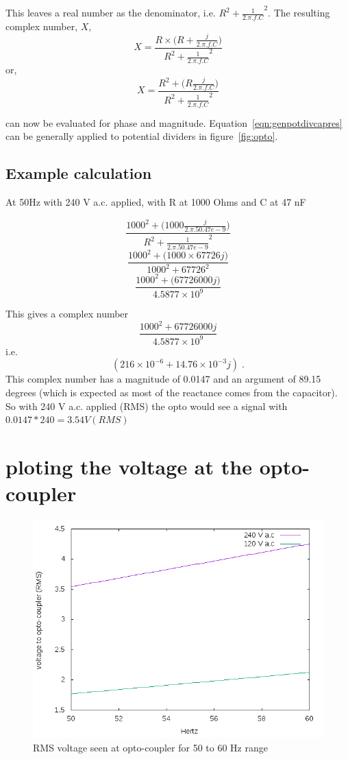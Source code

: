 \documentclass[a4paper,10pt]{article}
\begin{document}
This leaves a real number as the denominator, i.e. $ R^2 + {\frac{1}{2.\pi.f.C}}^2$. 
The resulting complex number, $X$,  
$$X = \frac{R \times \Big({R+\frac{j}{2.\pi.f.C}}\Big) }{R^2 + {\frac{1}{2.\pi.f.C}}^2}$$ 
or,
\begin{equation}
 X =\frac{R^2 + \Big({R\frac{j}{2.\pi.f.C}}\Big) }{R^2 + {\frac{1}{2.\pi.f.C}}^2} 
\label{eqn:genpotdivcapres}
\end{equation}

can now be evaluated for phase and magnitude. Equation~\ref{eqn:genpotdivcapres} can be generally applied to potential dividers
in figure~\ref{fig:opto}.


\subsection{Example calculation}


At 50Hz with 240 V a.c. applied, with R at 1000 Ohms and C at 47 nF

$$\frac{1000^2 + \Big({1000\frac{j}{2.\pi.50.47e-9}}\Big) }{R^2 + {\frac{1}{2.\pi.50.47e-9}}^2}$$
$$\frac{1000^2 + \Big({1000 \times 67726j}\Big) }{1000^2 + {67726}^2}$$
$$\frac{1000^2 + \Big({67726000j}\Big) }{4.5877 \times 10^9}$$

This gives a complex number $$ \frac{1000^2 + {67726000j} }{4.5877 \times 10^9}$$ i.e. $$(216 \times 10^{-6} + 14.76\times 10^{-3} j ) \;.$$
This complex number has a magnitude of 0.0147 and an argument of 89.15 degrees (which is expected as most of the reactance comes from the capacitor).
So with 240 V a.c. applied (RMS) the opto would see a signal with $0.0147*240 = 3.54V (RMS)$
\clearpage
\section{ploting the voltage at the opto-coupler}

\begin{figure}[h]
 \centering
 \includegraphics[width=400pt]{./RMS_volts_to_opto.png}
 \caption{RMS voltage seen at opto-coupler for 50 to 60 Hz range}
 \label{fig:rmstoopto}
\end{figure}
\end{document}
